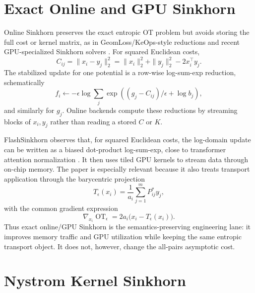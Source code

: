 \documentclass[11pt]{article}
\newcommand{\OT}{\operatorname{OT}}
\begin{document}
\section{Exact Online and GPU Sinkhorn}

Online Sinkhorn preserves the exact entropic OT problem but avoids storing the
full cost or kernel matrix, as in GeomLoss/KeOps-style reductions and recent
GPU-specialized Sinkhorn solvers
\citep{feydy2019geomloss,charlier2021keops,ye2026flashsinkhorn,xiao2026fastsinkhorn}.
For squared Euclidean costs,
\begin{equation}
C_{ij}=\|x_i-y_j\|_2^2
=\|x_i\|_2^2+\|y_j\|_2^2-2x_i^\top y_j.
\label{eq:sqeuclidean-dot}
\end{equation}
The stabilized update for one potential is a row-wise log-sum-exp reduction,
schematically
\begin{equation}
f_i
\leftarrow
-\epsilon\log\sum_j
\exp\left((g_j-C_{ij})/\epsilon+\log b_j\right),
\label{eq:log-domain-update}
\end{equation}
and similarly for $g_j$.  Online backends compute these reductions by
streaming blocks of $x_i,y_j$ rather than reading a stored $C$ or $K$.

FlashSinkhorn observes that, for squared Euclidean costs, the log-domain update
can be written as a biased dot-product log-sum-exp, close to transformer
attention normalization \citep{ye2026flashsinkhorn}.  It then uses tiled GPU
kernels to stream data through on-chip memory.  The paper is especially
relevant because it also treats
transport application through the barycentric projection
\begin{equation}
T_\epsilon(x_i)
=
\frac{1}{a_i}\sum_{j=1}^m P^\ast_{ij}y_j,
\label{eq:flash-barycentric}
\end{equation}
with the common gradient expression
\begin{equation}
\nabla_{x_i} \OT_\epsilon
=
2a_i\bigl(x_i-T_\epsilon(x_i)\bigr).
\label{eq:flash-gradient}
\end{equation}
Thus exact online/GPU Sinkhorn is the semantics-preserving engineering lane:
it improves memory traffic and GPU utilization while keeping the same entropic
transport object.  It does not, however, change the all-pairs asymptotic cost.

\section{Nystrom Kernel Sinkhorn}
\end{document}
